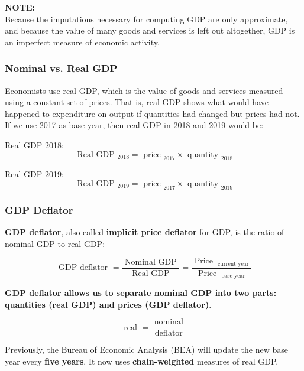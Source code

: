\documentclass[12pt]{article}
\begin{document}
{\textbf {NOTE:}}\\
Because the imputations necessary for computing GDP are only approximate, and because the value of many goods and services is left out altogether, GDP is an imperfect measure of economic activity.


\subsubsection{Nominal vs. Real GDP}

Economists use real GDP, which is the value of goods and services measured using a 
constant set of prices. That is, real GDP shows what would have happened to
expenditure on output if quantities had changed but prices had not.\\
If we use 2017 as base year, then real GDP in 2018 and 2019 would be:

Real GDP 2018:
\begin{equation*}
\text{ Real GDP }_{2018} = \text{ price }_{2017}  \times \text{ quantity }_{2018}
\end{equation*}


Real GDP 2019:
\begin{equation*}
\text{ Real GDP }_{2019} = \text{ price }_{2017}  \times \text{ quantity }_{2019}
\end{equation*}



\subsubsection{GDP Deflator}
{\textbf {GDP deflator}}, also called {\textbf {implicit price deflator}} for GDP,
is the ratio of nominal GDP to real GDP:

\begin{equation*}
\text{ GDP deflator } = \frac{\text{ Nominal GDP }}{\text{ Real GDP }} = 
\frac{\text{ Price }_{\text{ current year }}}{\text{ Price }_{\text{ base year }}}
\end{equation*}

{\textbf {GDP deflator allows us to separate nominal GDP into two parts: quantities
(real GDP) and prices (GDP deflator)}}.

\begin{equation*}
\text{ real }  = \frac{\text{ nominal }}{\text{ deflator }}
\end{equation*}

Previously, the Bureau of Economic Analysis (BEA) will update the new base year every 
{\textbf {five years}}. It now uses {\textbf {chain-weighted}} measures of real GDP.
\end{document}
